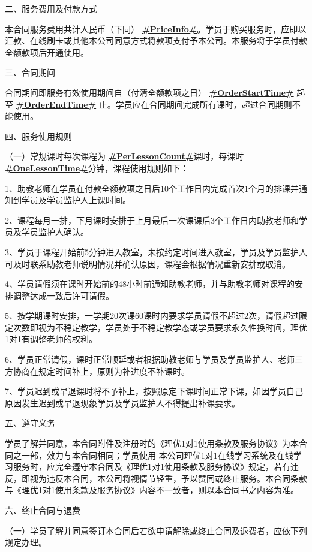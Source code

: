 \documentclass {ctexart}
\begin{document}
二、服务费用及付款方式


本合同服务费用共计人民币（下同）  \textbf{\underline{#PriceInfo#}}。学员于购买服务时，应即以汇款、在线刷卡或其他本公司同意方式将款项支付予本公司。本服务将于学员付款全额款项后开通使用。



三、合同期间



合同期间即服务有效使用期间自（付清全额款项之日） \textbf{\underline{#OrderStartTime#}} 起至  \textbf{\underline{#OrderEndTime#}} 止。学员应在合同期间完成所有课时，超过合同期则不能使用。


四、服务使用规则


（一）常规课时每次课程为 \underline{\textbf{#PerLessonCount#}}课时，每课时 \underline{\textbf{#OneLessonTime#}}分钟，课程使用规则如下：


1、助教老师在学员在付款全额款项之日后10个工作日内完成首次1个月的排课并通知到学员及学员监护人上课时间。


2、课程每月一排，下月课时安排于上月最后一次课课后3个工作日内助教老师和学员及学员监护人确认。


3、学员于课程开始前5分钟进入教室，未按约定时间进入教室，学员及学员监护人可及时联系助教老师说明情况并确认原因，课程会根据情况重新安排或取消。


4、学员请假须在课时开始前的48小时前通知助教老师，并与助教老师对课程的安排调整达成一致后许可请假。


5、按学期课时安排，一学期20次课60课时内要求学员请假不超过2次，请假超过限定次数即视为不稳定教学，学员处于不稳定教学态或学员要求永久性换时间，理优1对1有调整老师的权利。


6、学员正常请假，课时正常顺延或者根据助教老师与学员及学员监护人、老师三方协商在规定时间补上，原则为补进度不补课时。


7、学员迟到或早退课时将不予补上，按照原定下课时间正常下课，如因学员自己原因发生迟到或早退现象学员及学员监护人不得提出补课要求。



五、遵守义务


学员了解并同意，本合同附件及注册时的《理优1对1使用条款及服务协议》为本合同之一部，效力与本合同相同；学员使用 本公司理优1对1在线学习系统及在线学习服务时，应完全遵守本合同及《理优1对1使用条款及服务协议》规定，若有违反，即视为违反本合同，本公司将视情节轻重，予以赞同或终止服务。本合同条款与《理优1对1使用条款及服务协议》内容不一致者，则以本合同书之内容为准。


六、终止合同与退费


（一）学员了解并同意签订本合同后若欲申请解除或终止合同及退费者，应依下列规定办理。
\end{document}
